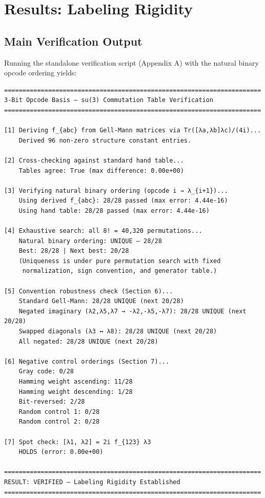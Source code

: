 \documentclass[11pt,a4paper]{article}
\begin{document}
\section{Results: Labeling Rigidity}

\subsection{Main Verification Output}

Running the standalone verification script (Appendix A) with the natural binary opcode ordering yields:

\begin{lstlisting}
======================================================================
3-Bit Opcode Basis — su(3) Commutation Table Verification
======================================================================

[1] Deriving f_{abc} from Gell-Mann matrices via Tr([λa,λb]λc)/(4i)...
    Derived 96 non-zero structure constant entries.

[2] Cross-checking against standard hand table...
    Tables agree: True (max difference: 0.00e+00)

[3] Verifying natural binary ordering (opcode i → λ_{i+1})...
    Using derived f_{abc}: 28/28 passed (max error: 4.44e-16)
    Using hand table: 28/28 passed (max error: 4.44e-16)

[4] Exhaustive search: all 8! = 40,320 permutations...
    Natural binary ordering: UNIQUE — 28/28
    Best: 28/28 | Next best: 20/28
    (Uniqueness is under pure permutation search with fixed
     normalization, sign convention, and generator table.)

[5] Convention robustness check (Section 6)...
    Standard Gell-Mann: 28/28 UNIQUE (next 20/28)
    Negated imaginary (λ2,λ5,λ7 → -λ2,-λ5,-λ7): 28/28 UNIQUE (next 20/28)
    Swapped diagonals (λ3 ↔ λ8): 28/28 UNIQUE (next 20/28)
    All negated: 28/28 UNIQUE (next 20/28)

[6] Negative control orderings (Section 7)...
    Gray code: 0/28
    Hamming weight ascending: 11/28
    Hamming weight descending: 1/28
    Bit-reversed: 2/28
    Random control 1: 0/28
    Random control 2: 0/28

[7] Spot check: [λ1, λ2] = 2i f_{123} λ3
    HOLDS (error: 0.00e+00)

======================================================================
RESULT: VERIFIED — Labeling Rigidity Established
======================================================================
\end{lstlisting}
\end{document}
